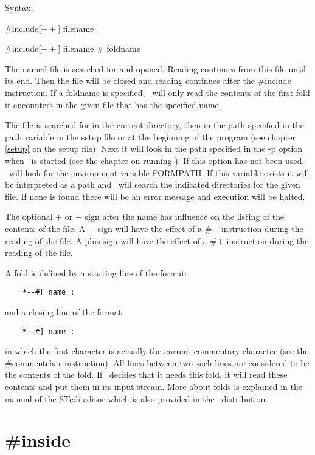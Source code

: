\noindent Syntax:

\#include[$-+$] filename

\#include[$-+$] filename \# foldname

\noindent The named file is searched for and opened. 
Reading continues from this file until its end. Then the 
file will be closed and reading continues after the \#include instruction. 
If a foldname is specified, \FORM\ will only read the 
contents of the first fold it encounters in the given file that 
has the specified name.

The file is searched for in the current directory, then in the path 
specified in the path variable in the setup file or at the 
beginning of the program (see chapter \ref{setup} on the setup file). Next 
it will look in the path specified in the -p option when \FORM\ is started 
(see the chapter on running \FORM). If this option has not been used, \FORM\ 
will look for the environment variable FORMPATH. If this 
variable exists it will be interpreted as a path and \FORM\ will search the 
indicated directories for the given file. If none is found there will be an 
error message and execution will be halted.

The optional $+$ or $-$ sign after the name has influence on the listing of the 
contents of the file. A $-$ sign will have the effect of a \#$-$ instruction 
during the reading of the file. A plus sign will have the effect of a \#$+$ 
instruction during the reading of the file.

A fold is defined by a starting line of the format:
\begin{verbatim}
    *--#[ name :
\end{verbatim}
and a closing line of the format
\begin{verbatim}
    *--#] name :
\end{verbatim}
in which the first character is actually the current 
commentary character (see the \#commentchar instruction). 
All lines between two such lines are considered to be the contents of the 
fold. If \FORM\ decides that it needs this fold, it will read these contents 
and put them in its input stream. More about folds is explained in the 
manual of the STedi editor which is also provided in the \FORM\ 
distribution.


\section{\#inside}
\label{preinside}

